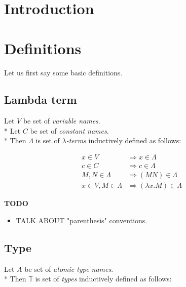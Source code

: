 \documentclass[12pt,a4paper]{report}
\begin{document}
\newpage


\tableofcontents	
	
\chapter*{Introduction}
	
\chapter{Definitions}
	
	Let us first say some basic definitions.
		
\section{Lambda term}
	
	Let $V$ be set of {\it variable names}.  \\* 
	Let $C$ be set of {\it constant names}.	 \\*		
	Then $\Lambda$ is set of {\it $\lambda$-terms} inductively defined as follows:
	
	\begin{align*}
		 x   \in V                 &\Rightarrow     x   \in \Lambda \\
		 c   \in C                 &\Rightarrow     c   \in \Lambda \\
		 M,N \in \Lambda           &\Rightarrow ( M N ) \in \Lambda \\
		 x   \in V , M \in \Lambda &\Rightarrow ( \lambda x . M ) \in \Lambda 
	\end{align*} 

	\textbf{TODO} 
	\begin{itemize} 
		\item TALK ABOUT "parenthesis" conventions. 
	\end{itemize}
	
\section{Type}
\label{deftype}

	Let $A$ be set of {\it atomic type names}. \\*
	Then $\mathbb{T}$ is set of {\it types} inductively defined as follows:
	
\end{document}
